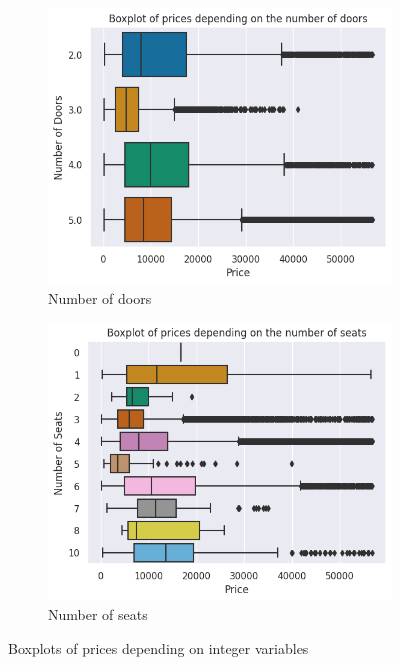 \documentclass[12pt]{article}
\begin{document}
\FloatBarrier
\begin{figure}[ht]
  \centering
  \begin{subfigure}{0.35\textwidth}
    \includegraphics[width=\linewidth]{number of doors.png}
    \caption{Number of doors}
    \label{fig:image1}
  \end{subfigure}
  \begin{subfigure}{0.35\textwidth}
    \includegraphics[width=\linewidth]{number of seats.png}
    \caption{Number of seats}
    \label{fig:image2}
  \end{subfigure}
  \caption{Boxplots of prices depending on integer variables}
  \label{Two boxplots}
\end{figure}
\FloatBarrier
\end{document}

